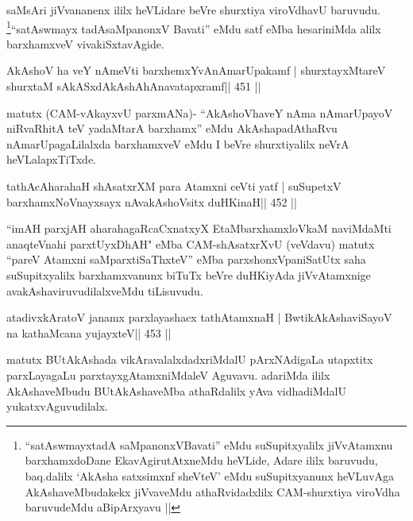 \begin{artha}
saMsAri jiVvananenx ililx heVLidare beVre shurxtiya viroVdhavU
baruvudu. \footnote[1]{``satAswmayxtadA saMpanonxVBavati'' eMdu suSupitxyalilx jiVvAtamxnu
barxhamxdoDane EkavAgirutAtxneMdu heVLide, Adare ililx baruvudu,
baq.dalilx `AkAsha satxsimxnf sheVteV' eMdu suSupitxyanunx heVLuvAga
AkAshaveMbudakekx jiVvaveMdu athaRvidadxlilx CAM-shurxtiya viroVdha
baruvudeMdu aBipArxyavu ||}``satAswmayx tadAsaMpanonxV Bavati'' eMdu satf eMba
hesariniMda alilx barxhamxveV vivakiSxtavAgide.
\end{artha}


\begin{shl}
AkAshoV ha veY nAmeVti barxhemxYvAnAmarUpakamf |
shurxtayxMtareV shurxtaM sAkASxdAkAshAhAnavatapxramf\hfill || 451 ||
\end{shl}

\begin{artha}
matutx (CAM-vAkayxvU parxmANa)- ``AkAshoVhaveY nAma nAmarUpayoV niRvaRhitA teV yadaMtarA barxhamx'' eMdu AkAshapadAthaRvu nAmarUpagaLilalxda barxhamxveV eMdu I beVre shurxtiyalilx neVrA heVLalapxTiTxde.
\end{artha}

\begin{shl}
tathAcAharahaH shAsatxrXM para Atamxni ceVti yatf |
suSupetxV barxhamxNoV\s nayxsayx nAvakAshoV\s sitx duHKinaH\hfill || 452 ||
\end{shl}

\begin{artha}
``imAH parxjAH aharahagaRcaCxnatxyX EtaMbarxhamxloVkaM naviMdaMti   anaqteVnahi parxtUyxDhAH" eMba CAM-shAsatxrXvU (veVdavu) matutx   ``pareV Atamxni saMparxtiSaThxteV'' eMba parxshonxVpaniSatUtx saha   suSupitxyalilx barxhamxvanunx biTuTx beVre duHKiyAda jiVvAtamxnige   avakAshaviruvudilalxveMdu tiLisuvudu.
\end{artha}

\begin{shl}
atadivxkAratoV janamx parxlayashacx tathA\s\s tamxnaH |
BwtikAkAshaviSayoV na kathaMcana yujayxteV\hfill || 453 ||
\end{shl}

\begin{artha}
matutx BUtAkAshada vikAravalalxdadxriMdalU pArxNAdigaLa utapxtitx parxLayagaLu parxtayxgAtamxniMdaleV Aguvavu. adariMda ililx AkAshaveMbudu BUtAkAshaveMba athaRdalilx yAva vidhadiMdalU yukatxvAguvudilalx.
\end{artha}



